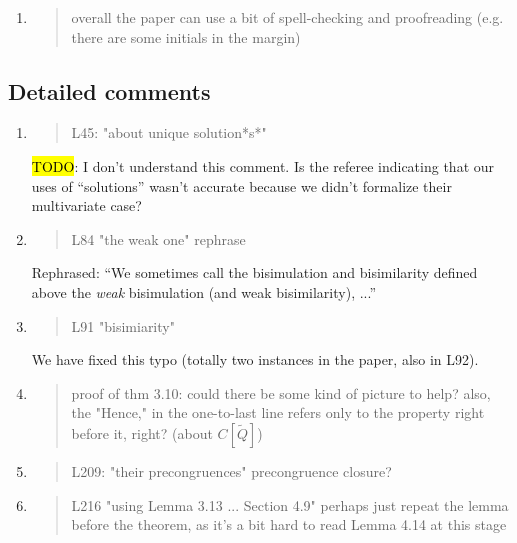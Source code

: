 \begin{enumerate}
\item \begin{quote}
    overall the paper can use a bit of spell-checking and proofreading (e.g. there are some initials in the margin)
  \end{quote}


\end{enumerate}

\subsection*{Detailed comments}

\begin{enumerate}
\item \begin{quote}
    L45: "about unique solution*s*"
  \end{quote}

  \hl{TODO}: I don't understand this comment. Is the referee indicating
  that our uses of ``solutions'' wasn't accurate because we didn't
  formalize their multivariate case?
  
\item \begin{quote}
    L84 "the weak one" rephrase
  \end{quote}

  Rephrased: ``We sometimes call the bisimulation and bisimilarity defined above
the \emph{weak} bisimulation (and weak bisimilarity), ...''
  
\item \begin{quote}
    L91 "bisimiarity"
  \end{quote}

  We have fixed this typo (totally two instances in the paper, also in L92).
  
\item \begin{quote}
    proof of thm 3.10: could there be some kind of picture to help? also, the "Hence," in the one-to-last line refers only to the property right before it, right? (about $C[\tilde{Q}]$)
  \end{quote}

\item \begin{quote}
    L209: "their precongruences" precongruence closure?
  \end{quote}

\item \begin{quote}
    L216 "using Lemma 3.13 ... Section 4.9" perhaps just repeat the lemma before the theorem, as it's a bit hard to read Lemma 4.14 at this stage 
  \end{quote}


\end{enumerate}
